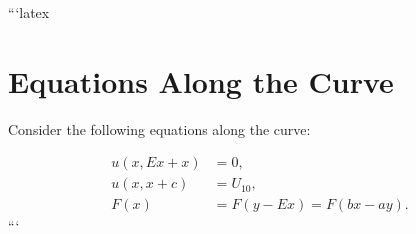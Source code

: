 ```latex
\section*{Equations Along the Curve}

Consider the following equations along the curve:

\begin{align}
    u(x, Ex + x) &= 0, \\
    u(x, x + c) &= U_{10}, \\
    F(x) &= F(y - Ex) = F(bx - ay).
\end{align}
```
